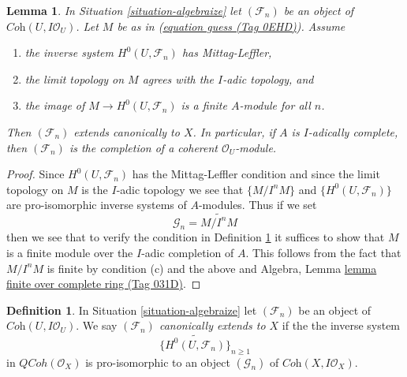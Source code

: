 \documentclass{amsart}
\theoremstyle{plain}
\newtheorem{lemma}[subsection]{Lemma}
\theoremstyle{definition}
\newtheorem{definition}[subsection]{Definition}
\theoremstyle{remark}
\numberwithin{equation}{subsection}
\def\QCoh{\mathit{QCoh}}
\begin{document}
\begin{lemma}
\label{lemma-when-done}
In Situation \ref{situation-algebraize} let $(\mathcal{F}_n)$ be an object
of $\textit{Coh}(U, I\mathcal{O}_U)$. Let $M$ be as in (\href{https://stacks.math.columbia.edu/tag/0EHD}{equation guess (Tag 0EHD)}).
Assume
\begin{enumerate}
\item[(a)] the inverse system $H^0(U, \mathcal{F}_n)$ has Mittag-Leffler,
\item[(b)] the limit topology on $M$ agrees with the $I$-adic topology, and
\item[(c)] the image of $M \to H^0(U, \mathcal{F}_n)$ is a finite $A$-module
for all $n$.
\end{enumerate}
Then $(\mathcal{F}_n)$ extends canonically to $X$.
In particular, if $A$ is $I$-adically complete, then
$(\mathcal{F}_n)$ is the completion of a coherent $\mathcal{O}_U$-module.
\end{lemma}

\begin{proof}
Since $H^0(U, \mathcal{F}_n)$ has the Mittag-Leffler condition
and since the limit topology on $M$ is the $I$-adic topology
we see that $\{M/I^nM\}$ and $\{H^0(U, \mathcal{F}_n)\}$
are pro-isomorphic inverse systems of $A$-modules.
Thus if we set
$$
\mathcal{G}_n = \widetilde{M/I^n M}
$$
then we see that to verify the condition in
Definition \ref{definition-canonically-algebraizable}
it suffices to show that $M$ is a finite module over the
$I$-adic completion of $A$. This follows from
the fact that $M/I^n M$ is finite by condition (c)
and the above and
Algebra, Lemma \href{https://stacks.math.columbia.edu/tag/031D}{lemma finite over complete ring (Tag 031D)}.
\end{proof}


\begin{definition}
\label{definition-canonically-algebraizable}
In Situation \ref{situation-algebraize} let $(\mathcal{F}_n)$ be an
object of $\textit{Coh}(U, I\mathcal{O}_U)$. We say
{\it $(\mathcal{F}_n)$ canonically extends to $X$} if the the
inverse system
$$
\{\widetilde{H^0(U, \mathcal{F}_n)}\}_{n \geq 1}
$$
in $\QCoh(\mathcal{O}_X)$ is pro-isomorphic to an object
$(\mathcal{G}_n)$ of $\textit{Coh}(X, I\mathcal{O}_X)$.
\end{definition}
\end{document}

